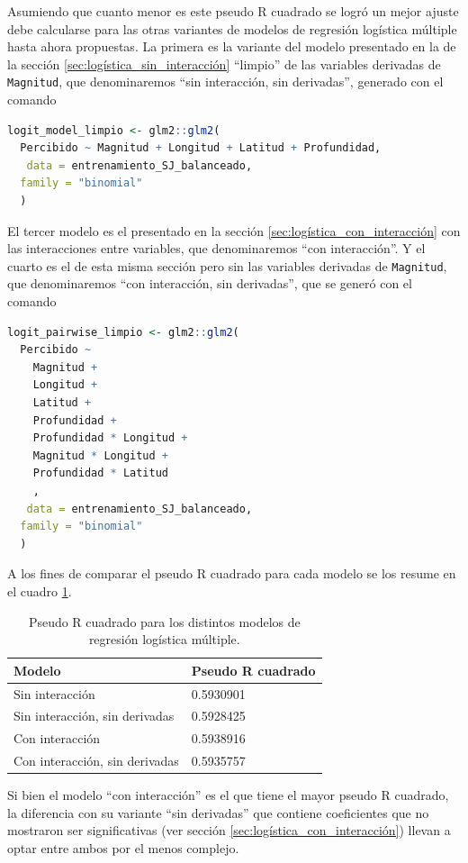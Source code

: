 \documentclass[a4paper]{report}
\begin{document}
Asumiendo que cuanto menor es este pseudo R cuadrado se logró un mejor ajuste debe calcularse para las otras variantes de modelos de regresión logística múltiple hasta ahora propuestas.
La primera es la variante del modelo presentado en la de la sección \ref{sec:logística_sin_interacción} ``limpio'' de las variables derivadas de \verb'Magnitud', que denominaremos ``sin interacción, sin derivadas'', generado con el comando
\begin{lstlisting}[language=R, breaklines=true]
logit_model_limpio <- glm2::glm2(
  Percibido ~ Magnitud + Longitud + Latitud + Profundidad,
   data = entrenamiento_SJ_balanceado,
  family = "binomial"
  )
\end{lstlisting}

El tercer modelo es el presentado en la sección \ref{sec:logística_con_interacción} con las interacciones entre variables, que denominaremos ``con interacción''.
Y el cuarto es el de esta misma sección pero sin las variables derivadas de \verb'Magnitud', que denominaremos ``con interacción, sin derivadas'', que se generó con el comando
\begin{lstlisting}[language=R, breaklines=true]
	logit_pairwise_limpio <- glm2::glm2(
  Percibido ~
    Magnitud +
    Longitud +
    Latitud +
    Profundidad +
    Profundidad * Longitud +
    Magnitud * Longitud +
    Profundidad * Latitud
    ,
   data = entrenamiento_SJ_balanceado,
  family = "binomial"
  )
\end{lstlisting}

A los fines de comparar el pseudo R cuadrado para cada modelo se los resume en el cuadro \ref{tab:pseudo_r2}.
\begin{table}[!ht]
	\centering
	\begin{tabular}{ll}
		\toprule
		Modelo & Pseudo R cuadrado\\
		\midrule
		Sin interacción & 0.5930901\\
		Sin interacción, sin derivadas &  0.5928425\\
		Con interacción &  0.5938916\\
		Con interacción, sin derivadas & 0.5935757\\
		\bottomrule
	\end{tabular}
	\caption{Pseudo R cuadrado para los distintos modelos de regresión logística múltiple.}
	\label{tab:pseudo_r2}
\end{table}

Si bien el modelo ``con interacción'' es el que tiene el mayor pseudo R cuadrado, la diferencia con su variante ``sin derivadas'' que contiene coeficientes que no mostraron ser significativas (ver sección \ref{sec:logística_con_interacción}) llevan a optar entre ambos por el menos complejo.
\end{document}
